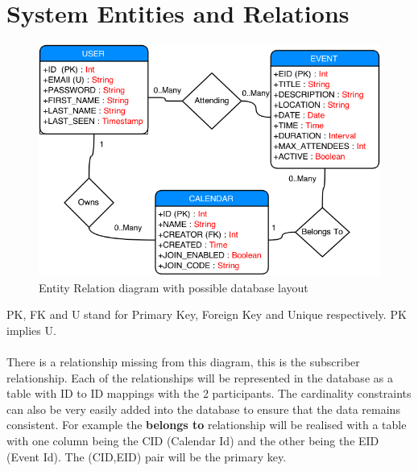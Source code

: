 \documentclass[10pt,a4paper]{article}
\begin{document}
\section{System Entities and Relations} 
\label{sec:er}
\begin{figure}[H]
\centerline{\includegraphics[scale=0.58,trim=0 0 100 0]{er}}
\caption{Entity Relation diagram with possible database layout}
\end{figure}
PK, FK and U stand for Primary Key, Foreign Key and Unique respectively. PK implies U.
\\
\\
\noindent
There is a relationship missing from this diagram, this is the subscriber relationship. Each of the relationships will be represented in the database as a table with ID to ID mappings with the 2 participants. The cardinality constraints can also be very easily added into the database to ensure that the data remains consistent. For example the \textbf{belongs to} relationship will be realised with a table with one column being the CID (Calendar Id) and the other being the EID (Event Id). The (CID,EID) pair will be the primary key.
\newpage
\end{document}
